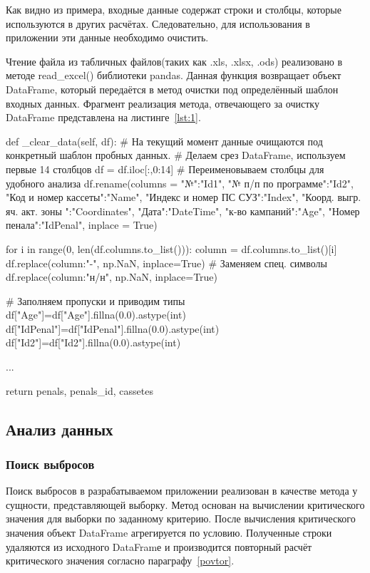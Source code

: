 Как видно из примера, входные данные содержат строки и столбцы, которые используются в других расчётах. Следовательно, для использования в приложении эти данные необходимо очистить. 

Чтение файла из табличных файлов(таких как .xls, .xlsx, .ods) реализовано в методе read\_excel() библиотеки pandas. Данная функция возвращает объект DataFrame, который передаётся в метод очистки под определённый шаблон входных данных. Фрагмент реализация метода, отвечающего за очистку DataFrame представлена на листинге~\ref{lst:1}. 

\begin{flushleft}
 \label{lst:1}
\begin{MyCodes}
def _clear_data(self, df):
	# На текущий момент данные очищаются под конкретный шаблон пробных данных.
	# Делаем срез DataFrame, используем первые 14 столбцов
	df = df.iloc[:,0:14] 
	# Переименовываем столбцы для удобного анализа
	df.rename(columns = {
		"№":"Id1",
		"№ п/п по программе":"Id2",
		"Код  и номер кассеты":"Name",
		"Индекс и номер ПС СУЗ":"Index",
		"Коорд. выгр. яч. акт. зоны ":"Coordinates",
		"Дата":"DateTime",
		"к-во кампаний":"Age",
		"Номер пенала":"IdPenal"}, inplace = True)
	
	for i in range(0, len(df.columns.to_list())):
		column = df.columns.to_list()[i]
		df.replace({column:"-"}, np.NaN, inplace=True) # Заменяем спец. символы
		df.replace({column:"н/н"}, np.NaN, inplace=True)
	
	# Заполняем пропуски и приводим типы
	df["Age"]=df["Age"].fillna(0.0).astype(int)
	df["IdPenal"]=df["IdPenal"].fillna(0.0).astype(int)
	df["Id2"]=df["Id2"].fillna(0.0).astype(int)
	
	...
	
	return penals, penals_id, cassetes

\end{MyCodes}
\end{flushleft}

\subsection{Анализ данных}

\subsubsection{Поиск выбросов}

Поиск выбросов в разрабатываемом приложении реализован в качестве метода у сущности, представляющей выборку. Метод основан на вычислении критического значения для выборки по заданному критерию. После вычисления критического значения объект DataFrame агрегируется по условию. Полученные строки удаляются из исходного DataFramе и производится повторный расчёт критического значения согласно параграфу~\ref{povtor}. 


